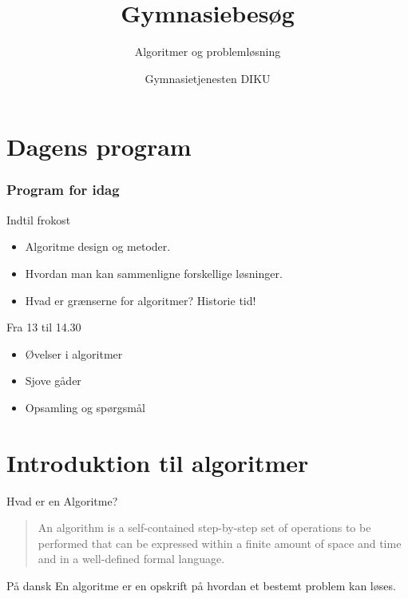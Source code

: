 \documentclass[12pt,t]{beamer}
\title{Gymnasiebesøg}
\subtitle{Algoritmer og problemløsning}
\author{Gymnasietjenesten DIKU}
\institute{Department of Computer Science}
\begin{document}
\frame[plain]{\titlepage}
\frame{\tableofcontents}

\section{Dagens program}
\begin{frame}
    \frametitle{Program for idag}
    \begin{block}{Indtil frokost}
        \begin{itemize}
            \item Algoritme design og metoder. \pause
            \item Hvordan man kan sammenligne forskellige løsninger. \pause
            \item Hvad er grænserne for algoritmer? \pause \alert{Historie tid!}
        \end{itemize}
    \end{block}
    \pause
    \begin{block}{Fra 13 til 14.30}
        \begin{itemize}
            \item Øvelser i algoritmer \pause
            \item Sjove gåder \pause
            \item Opsamling og spørgsmål
        \end{itemize}
    \end{block}
\end{frame}

\section{Introduktion til algoritmer}
    \begin{frame}[c]{Hvad er en Algoritme?}
        \begin{quote}
            An algorithm is a self-contained step-by-step set of operations to
            be performed that can be expressed within a finite amount of space
            and time and in a well-defined formal language.
        \end{quote}
        \pause
        \begin{block}{På dansk}
            En algoritme er en \alert{opskrift} på hvordan et bestemt problem
            kan løses.
        \end{block}
    \end{frame}
\end{document}
